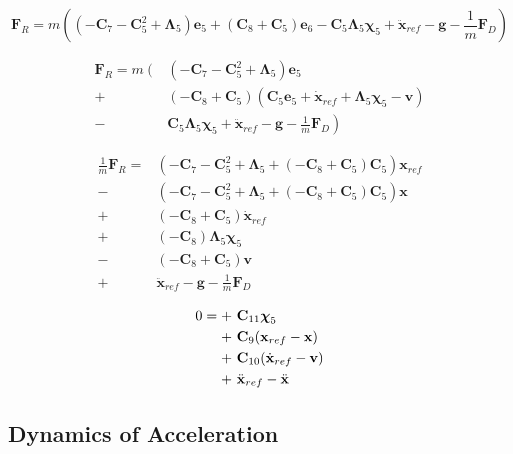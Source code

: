\[
\mathbf{F}_{R}
= m \left(
	\left( -\mathbf{C}_7 - \mathbf{C}_5^2 + \boldsymbol\Lambda_5\right) \mathbf{e}_5 +
	\left( \mathbf{C}_8 + \mathbf{C}_5 \right) \mathbf{e}_6 
	- \mathbf{C}_5 \boldsymbol\Lambda_5 \boldsymbol\chi_5
	+ \ddot{\mathbf{x}}_{ref}
	- \mathbf{g}
	- \frac{1}{m} \mathbf{F}_{D}
\right)
\]

\begin{align}\nonumber
\mathbf{F}_{R}
= m \left( \right. & \left( -\mathbf{C}_7 - \mathbf{C}_5^2 + \boldsymbol\Lambda_5 \right) \mathbf{e}_5 \\\nonumber
	+ &\left( -\mathbf{C}_8 + \mathbf{C}_5 \right) \left( \mathbf{C}_5 \mathbf{e}_5 + \dot{\mathbf{x}}_{ref} + \boldsymbol\Lambda_5 \boldsymbol\chi_5 - \mathbf{v}\right) \\\nonumber
	- &\left. \mathbf{C}_5 \boldsymbol\Lambda_5 \boldsymbol\chi_5
	+ \ddot{\mathbf{x}}_{ref}
	- \mathbf{g}
	- \frac{1}{m} \mathbf{F}_{D}
\right)
\end{align}

\begin{align}\nonumber
\frac{1}{m} \mathbf{F}_{R}
= & \left( -\mathbf{C}_7 - \mathbf{C}_5^2 + \boldsymbol\Lambda_5 + \left( -\mathbf{C}_8 + \mathbf{C}_5 \right) \mathbf{C}_5 \right) \mathbf{x}_{ref} \\\nonumber
- &\left( -\mathbf{C}_7 - \mathbf{C}_5^2 + \boldsymbol\Lambda_5 + \left( -\mathbf{C}_8 + \mathbf{C}_5 \right) \mathbf{C}_5 \right) \mathbf{x} \\\nonumber
+ &\left( -\mathbf{C}_8 + \mathbf{C}_5 \right) \dot{\mathbf{x}}_{ref} \\\nonumber
+ &\left( -\mathbf{C}_8 \right) \boldsymbol\Lambda_5 \boldsymbol\chi_5 \\\nonumber
- &\left( -\mathbf{C}_8 + \mathbf{C}_5 \right) \mathbf{v} \\\nonumber
+ &\ddot{\mathbf{x}}_{ref} - \mathbf{g} - \frac{1}{m} \mathbf{F}_{D}
\end{align}

\begin{align}\nonumber
0 = + &~ \mathbf{C}_{11} \boldsymbol\chi_5 \\\nonumber
+ &~ \mathbf{C}_9 (\mathbf{x}_{ref} - \mathbf{x}) \\\nonumber
+ &~ \mathbf{C}_{10} (\dot{\mathbf{x}}_{ref} - \mathbf{v}) \\\nonumber
+ &~ \ddot{\mathbf{x}}_{ref} - \ddot{\mathbf{x}}
\end{align}

\subsection{Dynamics of Acceleration}

